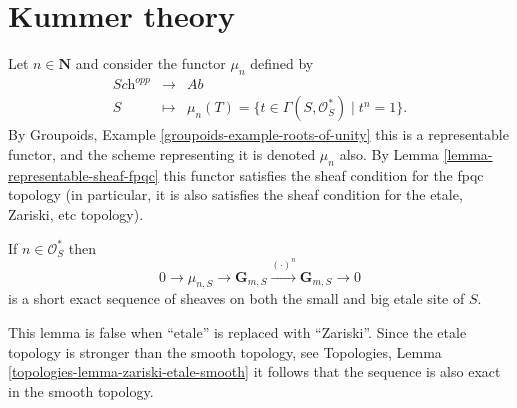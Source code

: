 \section{Kummer theory}
\label{section-kummer}

\noindent
Let $n \in \mathbf{N}$ and consider the functor $\mu_n$ defined by
$$
\begin{matrix}
\textit{Sch}^{opp} & \longrightarrow & \textit{Ab} \\
S & \longmapsto &
\mu_n(T)
=
\{t \in \Gamma(S, \mathcal{O}_S^*) \mid t^n = 1 \}.
\end{matrix}
$$
By
Groupoids, Example \ref{groupoids-example-roots-of-unity}
this is a representable functor, and the scheme representing it
is denoted $\mu_n$ also. By
Lemma \ref{lemma-representable-sheaf-fpqc}
this functor satisfies the sheaf condition for the fpqc topology
(in particular, it is also satisfies the sheaf condition for the
etale, Zariski, etc topology).

\begin{lemma}
\label{lemma-kummer-sequence}
If $n\in \mathcal{O}_S^*$ then
$$
0 \to
\mu_{n, S} \to
\mathbf{G}_{m, S} \xrightarrow{(\cdot)^n}
\mathbf{G}_{m, S} \to 0
$$
is a short exact sequence of sheaves on both the small and
big etale site of $S$.
\end{lemma}

\begin{remark}
\label{remark-no-kummer-sequence-zariski}
This lemma is false when ``etale'' is replaced with ``Zariski''.
Since the etale topology is stronger than the smooth topology, see
Topologies, Lemma \ref{topologies-lemma-zariski-etale-smooth}
it follows that the sequence is also exact in the smooth topology.
\end{remark}

